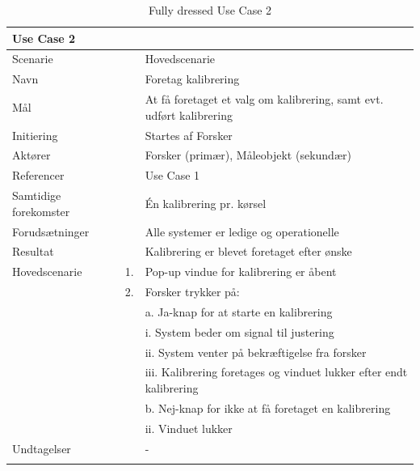 \begin{longtabu} to  %
	{\large \textbf{Use Case 2}} && \\
	\toprule
	Scenarie && Hovedscenarie\\
	Navn && Foretag kalibrering\\
	Mål && At få foretaget et valg om kalibrering, samt evt. udført kalibrering\\
	Initiering && Startes af Forsker\\
	Aktører && Forsker (primær), Måleobjekt (sekundær)\\
	Referencer && Use Case 1\\
	Samtidige forekomster  && Én kalibrering pr. kørsel \\
	Forudsætninger && Alle systemer er ledige og operationelle\\ 
	Resultat && Kalibrering er blevet foretaget efter ønske \\ \midrule
	Hovedscenarie &    1. &		Pop-up vindue for kalibrering er åbent\\				 	
	&    2. & Forsker trykker på:\\ 
	& &	a. Ja-knap for at starte en kalibrering\\[-1ex]
	& &		 i. System beder om signal til justering\\[-1ex]
	& &		 ii. System venter på bekræftigelse fra forsker\\[-1ex]
	& & 	 iii. Kalibrering foretages og vinduet lukker efter endt kalibrering\\[-1ex]
	& &  b. Nej-knap for ikke at få foretaget en kalibrering\\[-1ex]
	& &   ii. Vinduet lukker\\[-1ex]	
	Undtagelser && -  \\ \bottomrule
	
	\caption{Fully dressed Use Case 2}
	\label{UC2}
\end{longtabu}

